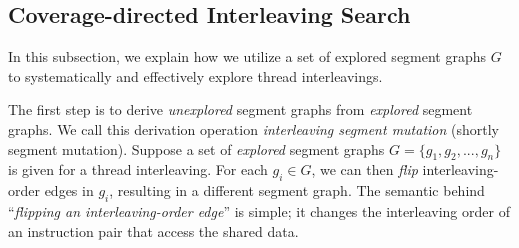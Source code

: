 \subsection{Coverage-directed Interleaving Search}
\label{ss:scheduler}
%
In this subsection, we explain how we utilize a set of explored
segment graphs $G$ to systematically and effectively explore thread
interleavings.



%
The first step is to derive \textit{unexplored} segment graphs from
\textit{explored} segment graphs. We call this derivation operation
\textit{interleaving segment mutation} (shortly segment mutation).
%
Suppose a set of \textit{explored} segment graphs
$G = \{g_1, g_2, ..., g_n \}$ is given for a thread interleaving.
%
For each $g_i \in G$, we can then \textit{flip} interleaving-order
edges in $g_i$, resulting in a different segment graph.
%
The semantic behind ``\textit{flipping an interleaving-order edge}''
is simple; it changes the interleaving order of an instruction pair
that access the shared data.





